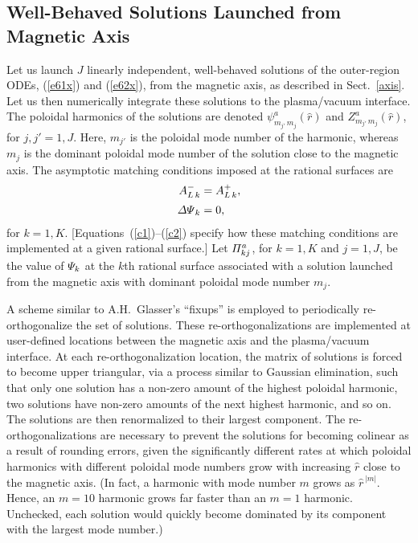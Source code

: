 \documentclass[12pt,prb,aps]{revtex4-1}
\begin{document}
\subsection{Well-Behaved Solutions Launched from Magnetic Axis}\label{axisl}
Let us launch $J$ linearly independent, well-behaved solutions of the outer-region ODEs, (\ref{e61x}) and (\ref{e62x}), from the
magnetic axis, as described in Sect.~\ref{axis}. Let us then numerically integrate these solutions to the plasma/vacuum interface. The poloidal harmonics of
the solutions are denoted $\psi^a_{m_{j'}\,m_j}(\hat{r})$ and $Z^a_{m_{j'}\,m_j}(\hat{r})$, for $j,j'=1,J$. Here,
$m_{j'}$ is the poloidal mode number of the harmonic, whereas $m_j$ is the dominant poloidal mode number of the solution close to the
magnetic axis. The asymptotic matching conditions imposed at the rational surfaces are
\begin{align}
A_{L\,k}^{-} &= A_{L\,k}^+,\\[0.5ex]
{\mit\Delta\Psi}_k &= 0,
\end{align}
for $k=1,K$. [Equations~(\ref{c1})--(\ref{c2}) specify how these matching conditions are implemented at a given rational surface.]
Let ${\mit\Pi}_{kj}^a$, for   $k=1,K$ and $j=1,J$,  be the value of ${\mit\Psi}_k$ at the $k$th rational surface associated with a solution launched
from the magnetic axis with dominant poloidal mode number $m_j$. 

A scheme similar to A.H.~Glasser's ``fixups'' \cite{ham} is employed to periodically re-orthogonalize the set of solutions. These  re-orthogonalizations are implemented at user-defined locations between the magnetic axis and the plasma/vacuum interface.  At each re-orthogonalization location, the matrix of solutions is forced to become upper triangular, via a process similar to Gaussian elimination, such that only one solution has a non-zero amount of the highest poloidal  harmonic, two solutions have non-zero amounts of the next highest harmonic, and so on. The solutions are then renormalized to their largest component. 
 The re-orthogonalizations are
 necessary to prevent the solutions for becoming colinear as a result of rounding errors, given the significantly
 different rates at which poloidal harmonics with different poloidal mode numbers grow with increasing $\hat{r}$  close to the magnetic axis. (In fact, a
 harmonic with mode number $m$ grows as $\hat{r}^{\,|m|}$. Hence, an $m=10$ harmonic  grows far faster than an $m=1$ harmonic. Unchecked, each solution
 would quickly become dominated by its component with the largest mode number.)
\end{document}
